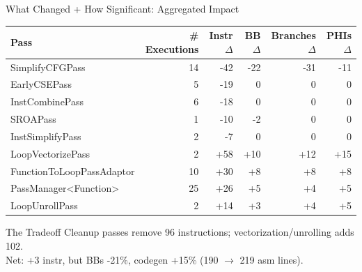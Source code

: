 \documentclass[aspectratio=169]{beamer}
\newcommand{\red}[1]{\textcolor{LPTARed}{#1}}
\newcommand{\green}[1]{\textcolor{LPTAGreen}{#1}}
\newcommand{\blue}[1]{\textcolor{LPTABlue}{#1}}
\begin{document}
\begin{frame}{What Changed + How Significant: Aggregated Impact}
  \begin{tabular}{lrrrrr}
    \toprule
    Pass & \# Executions & Instr $\Delta$ & BB $\Delta$ & Branches $\Delta$ & PHIs $\Delta$ \\
    \midrule
    SimplifyCFGPass       & 14 & \red{-42} & \red{-22} & \red{-31} & \red{-11} \\
    EarlyCSEPass          & 5  & \red{-19} & 0 & 0 & 0 \\
    InstCombinePass       & 6  & \red{-18} & 0 & 0 & 0 \\
    SROAPass              & 1  & \red{-10} & \red{-2} & 0 & 0 \\
    InstSimplifyPass      & 2  & \red{-7}  & 0 & 0 & 0 \\
    \midrule
    LoopVectorizePass     & 2  & \blue{+58}  & \blue{+10} & \blue{+12} & \blue{+15} \\
    FunctionToLoopPassAdaptor & 10 & \blue{+30} & \blue{+8} & \blue{+8} & \blue{+8} \\
    PassManager<Function> & 25 & \blue{+26} & \blue{+5} & \blue{+4} & \blue{+5} \\
    LoopUnrollPass        & 2  & \blue{+14} & \blue{+3} & \blue{+4} & \blue{+5} \\
    \bottomrule
  \end{tabular}
  \vspace{0.5em}
  \begin{block}{The Tradeoff}
    Cleanup passes remove 96 instructions; vectorization/unrolling adds 102.\\
    Net: \red{+3 instr}, but \green{BBs -21\%}, \blue{codegen +15\%} (190 $\to$ 219 asm lines).
  \end{block}
\end{frame}
\end{document}
